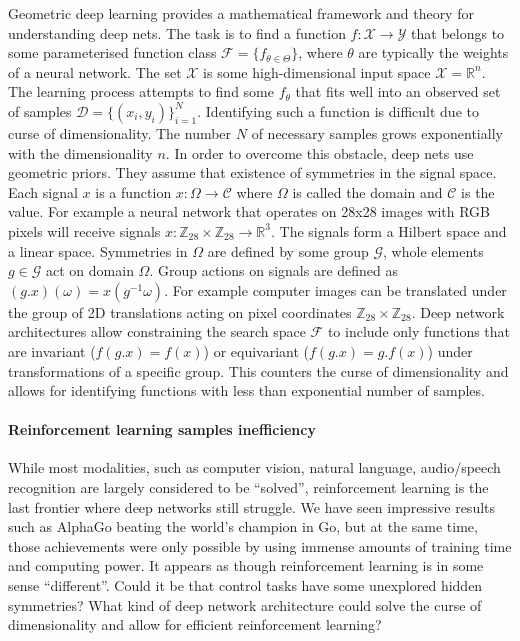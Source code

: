 \documentclass[12pt]{article}
\begin{document}
Geometric deep learning provides a mathematical framework and theory for understanding deep nets. The task is to find a function $f:\mathcal{X}\rightarrow\mathcal{Y}$ that belongs to some parameterised function class $\mathcal{F}=\{f_{\theta \in \Theta}\}$, where $\theta$ are typically the weights of a neural network. The set $\mathcal{X}$ is some high-dimensional input space $\mathcal{X}=\mathbb{R}^n$. The learning process attempts to find some $f_\theta$ that fits well into an observed set of samples $\mathcal{D}=\{(x_i,y_i)\}_{i=1}^N$. Identifying such a function is difficult due to curse of dimensionality. The number $N$ of necessary samples grows exponentially with the dimensionality $n$. In order to overcome this obstacle, deep nets use geometric priors. They assume that existence of symmetries in the signal space. Each signal $x$ is a function $x:\Omega \rightarrow \mathcal{C}$ where $\Omega$ is called the domain and $\mathcal{C}$ is the value.
For example a neural network that operates on 28x28 images with RGB pixels will receive signals $x:\mathbb{Z}_{28}\times \mathbb{Z}_{28} \rightarrow \mathbb{R}^{3}$. The signals form a Hilbert space and a linear space. Symmetries in $\Omega$ are defined by some group $\mathcal{G}$, whole elements $g\in \mathcal{G}$ act on domain $\Omega$. Group actions on signals are defined as $(g.x)(\omega)=x(g^{-1}\omega)$. For example computer images can be translated under the group of 2D translations acting on pixel coordinates $\mathbb{Z}_{28}\times \mathbb{Z}_{28}$. Deep network architectures allow constraining the search space $\mathcal{F}$ to include only functions that are invariant ($f(g.x)=f(x)$) or equivariant ($f(g.x)=g.f(x)$) under transformations of a specific group. This counters the curse of dimensionality and allows for identifying functions with less than exponential number of samples.

\paragraph{Reinforcement learning samples inefficiency}
While most modalities, such as computer vision, natural language, audio/speech recognition are largely considered to be ``solved'', reinforcement learning is the last frontier where deep networks still struggle. We have seen impressive results such as AlphaGo beating the world's champion in Go, but at the same time, those achievements were only possible by using immense amounts of training time and computing power. It appears as though reinforcement learning is in some sense ``different''. Could it be that control tasks have some unexplored hidden symmetries? What kind of deep network architecture could solve the curse of dimensionality and allow for efficient reinforcement learning?
\end{document}
